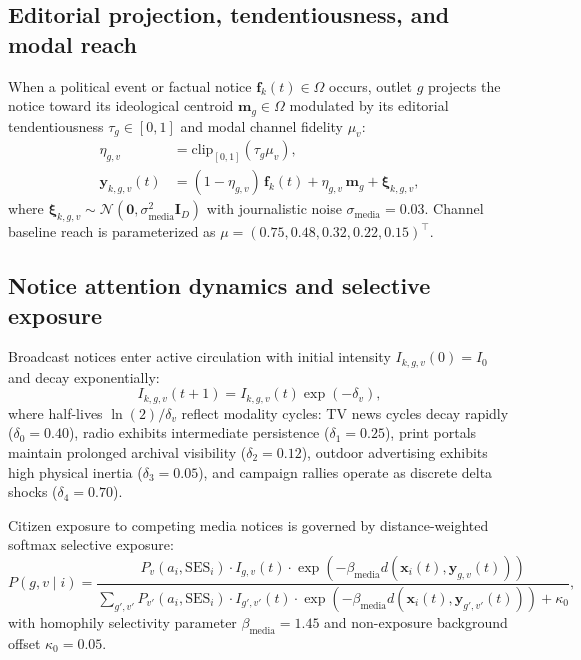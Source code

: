 \documentclass[11pt,a4paper]{article}
\begin{document}
\subsection{Editorial projection, tendentiousness, and modal reach}
\label{sssec:editorial_projection}
When a political event or factual notice $\mathbf{f}_k(t) \in \Omega$ occurs, outlet $g$ projects the notice toward its ideological centroid $\mathbf{m}_g \in \Omega$ modulated by its editorial tendentiousness $\tau_g \in [0, 1]$ and modal channel fidelity $\mu_v$:
\begin{align}
    \eta_{g,v} &= \mathrm{clip}_{[0, 1]}(\tau_g \mu_v), \label{eq:effective_bias_modality} \\
    \mathbf{y}_{k,g,v}(t) &= (1 - \eta_{g,v})\,\mathbf{f}_k(t) + \eta_{g,v}\,\mathbf{m}_g + \boldsymbol{\xi}_{k,g,v}, \label{eq:media_projection_vector}
\end{align}
where $\boldsymbol{\xi}_{k,g,v} \sim \mathcal{N}(\mathbf{0}, \sigma_{\mathrm{media}}^2 \mathbf{I}_D)$ with journalistic noise $\sigma_{\mathrm{media}} = 0.03$. Channel baseline reach is parameterized as $\mu = (0.75, 0.48, 0.32, 0.22, 0.15)^{\top}$.

\subsection{Notice attention dynamics and selective exposure}
\label{sssec:notice_attention_selective_exposure}
Broadcast notices enter active circulation with initial intensity $I_{k,g,v}(0) = I_0$ and decay exponentially:
\begin{equation}
    I_{k,g,v}(t+1) = I_{k,g,v}(t) \exp(-\delta_v),
    \label{eq:notice_exponential_decay}
\end{equation}
where half-lives $\ln(2)/\delta_v$ reflect modality cycles: TV news cycles decay rapidly ($\delta_0 = 0.40$), radio exhibits intermediate persistence ($\delta_1 = 0.25$), print portals maintain prolonged archival visibility ($\delta_2 = 0.12$), outdoor advertising exhibits high physical inertia ($\delta_3 = 0.05$), and campaign rallies operate as discrete delta shocks ($\delta_4 = 0.70$).

Citizen exposure to competing media notices is governed by distance-weighted softmax selective exposure:
\begin{equation}
    P(g, v \mid i) = \frac{P_v(a_i, \mathrm{SES}_i) \cdot I_{g,v}(t) \cdot \exp\!\left(-\beta_{\mathrm{media}} d(\mathbf{x}_i(t), \mathbf{y}_{g,v}(t))\right)}{\sum_{g',v'} P_{v'}(a_i, \mathrm{SES}_i) \cdot I_{g',v'}(t) \cdot \exp\!\left(-\beta_{\mathrm{media}} d(\mathbf{x}_i(t), \mathbf{y}_{g',v'}(t))\right) + \kappa_0},
    \label{eq:selective_exposure_softmax}
\end{equation}
with homophily selectivity parameter $\beta_{\mathrm{media}} = 1.45$ and non-exposure background offset $\kappa_0 = 0.05$.
\end{document}
